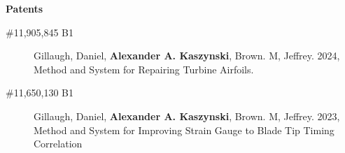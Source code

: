 \documentclass[letterpaper,11pt]{article}
\newcommand{\resheading}[1]{{\large \colorbox{mygrey}{\begin{minipage}{\textwidth}{\textbf{#1 \vphantom{p\^{E}}}}\end{minipage}}}}
\begin{document}
\begin{description}
\end{description}

\resheading{Patents}
\begin{description}
\item[\#11,905,845 B1]Gillaugh, Daniel, \textbf{Alexander A. Kaszynski}, Brown. M, Jeffrey. 2024, Method and System for Repairing Turbine Airfoils.
\item[\#11,650,130 B1]Gillaugh, Daniel, \textbf{Alexander A. Kaszynski}, Brown. M, Jeffrey. 2023, Method and System for Improving Strain Gauge to Blade Tip Timing Correlation
\end{description}
\end{document}

